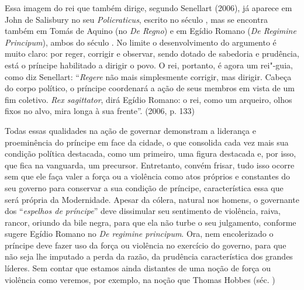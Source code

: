 Essa imagem do rei que também dirige, segundo Senellart (2006), já
aparece em John de Salisbury no seu \emph{Policraticus}, escrito no
século , mas se encontra também em Tomás de Aquino (no \emph{De
Regno}) e em Egídio Romano (\emph{De Regimine Principum}), ambos do
século . No limite o desenvolvimento do argumento é muito claro: por
reger, corrigir e observar, sendo dotado de sabedoria e prudência, está
o príncipe habilitado a dirigir o povo. O rei, portanto, é agora um
rei"-guia, como diz Senellart: ``\emph{Regere} não mais simplesmente
corrigir, mas dirigir. Cabeça do corpo político, o príncipe coordenará a
ação de seus membros em vista de um fim coletivo. \emph{Rex sagittator},
dirá Egídio Romano: o rei, como um arqueiro, olhos fixos no alvo, mira
longa à sua frente''. (2006, p. 133)

Todas essas qualidades na ação de governar demonstram a liderança e
proeminência do príncipe em face da cidade, o que consolida cada vez
mais sua condição política destacada, como um primeiro, uma figura
destacada e, por isso, que fica na vanguarda, um precursor. Entretanto,
convém frisar, tudo isso ocorre sem que ele faça valer a força ou a
violência como atos próprios e constantes do seu governo para conservar
a sua condição de príncipe, característica essa que será própria da
Modernidade. Apesar da cólera, natural nos homens, o governante dos
``\emph{espelhos de príncipe}'' deve dissimular seu sentimento de
violência, raiva, rancor, oriundo da bile negra, para que ela não turbe
o seu julgamento, conforme sugere Egídio Romano no \emph{De regimine
principum}. Ora, nem encolerizado o príncipe deve fazer uso da força ou
violência no exercício do governo, para que não seja lhe imputado a
perda da razão, da prudência característica dos grandes líderes. Sem
contar que estamos ainda distantes de uma noção de força ou violência
como veremos, por exemplo, na noção que Thomas Hobbes (séc. )
